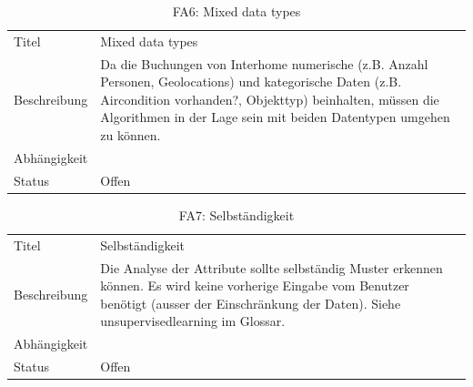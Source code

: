 \begin{table}[H] 
	\caption{FA6: Mixed data types}
	\centering
	\label{fig:anforderungsanalyse:funktionaleanforderung:fa6}
	\begin{tabular}{ | l | L{10cm} | } 
		\hline 
		 \\ \hline 
		Titel & Mixed data types \\ \hline 
		Beschreibung & Da die Buchungen von Interhome numerische (z.B. Anzahl Personen, Geolocations) und kategorische Daten (z.B. Aircondition vorhanden?, Objekttyp) beinhalten, müssen die Algorithmen in der Lage sein mit beiden Datentypen umgehen zu können. \\ \hline 
		Abhängigkeit & \\ \hline 
		Status & Offen \\ \hline 
	\end{tabular}
\end{table}

\begin{table}[H] 
	\caption{FA7: Selbständigkeit}
	\centering
	\label{fig:anforderungsanalyse:funktionaleanforderung:fa7}
	\begin{tabular}{ | l | L{10cm} | } 
		\hline 
		 \\ \hline 
		Titel & Selbständigkeit \\ \hline 
		Beschreibung & Die Analyse der Attribute sollte selbständig Muster erkennen können. Es wird keine vorherige Eingabe vom Benutzer benötigt (ausser der Einschränkung der Daten). Siehe \gls{unsupervisedlearning} im Glossar. \\ \hline 
		Abhängigkeit & \\ \hline 
		Status & Offen \\ \hline 
	\end{tabular}
\end{table}

